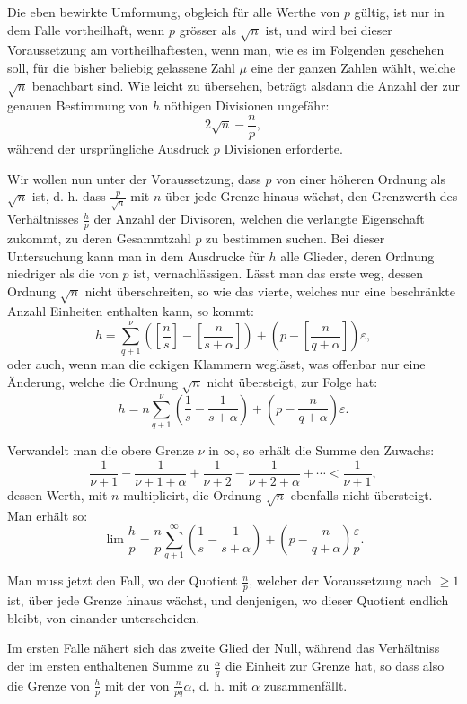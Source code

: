 \documentclass[11pt]{article}
\newcommand{\floor}[1]{\left[#1\right]}
\begin{document}
Die eben bewirkte Umformung, obgleich für alle Werthe von $p$ gültig, ist nur in dem Falle vortheilhaft, wenn $p$ grösser als $\sqrt n$ ist, und wird bei dieser Voraussetzung am vortheilhaftesten, wenn man, wie es im Folgenden geschehen soll, für die bisher beliebig gelassene Zahl $\mu$ eine der ganzen Zahlen wählt, welche $\sqrt n$ benachbart sind. Wie leicht zu übersehen, beträgt alsdann die Anzahl der zur genauen Bestimmung von $h$ nöthigen Divisionen ungefähr:
\[
 2\sqrt n-\frac np,
\]
während der ursprüngliche Ausdruck $p$ Divisionen erforderte.

Wir wollen nun unter der Voraussetzung, dass $p$ von einer höheren Ordnung als $\sqrt n$ ist, d. h. dass $\frac p{\sqrt n}$ mit $n$ über jede Grenze hinaus wächst, den Grenzwerth des Verhältnisses $\frac hp$ der Anzahl der Divisoren, welchen die verlangte Eigenschaft zukommt, zu deren Gesammtzahl $p$ zu bestimmen suchen. Bei dieser Untersuchung kann man in dem Ausdrucke für $h$ alle Glieder, deren Ordnung niedriger als die von $p$ ist, vernachlässigen. Lässt man das erste weg, dessen Ordnung $\sqrt n$ nicht überschreiten, so wie das vierte, welches nur eine beschränkte Anzahl Einheiten enthalten kann, so kommt:
\[
 h=\sum_{q+1}^{\nu}\left(\floor{\frac ns}-\floor{\frac n{s+\alpha}}\right)
 +\left(p-\floor{\frac n{q+\alpha}}\right)\varepsilon,
\]
oder auch, wenn man die eckigen Klammern weglässt, was offenbar nur eine Änderung, welche die Ordnung $\sqrt n$ nicht übersteigt, zur Folge hat:
\[
 h=n\sum_{q+1}^{\nu}\left(\frac1s-\frac1{s+\alpha}\right)+\left(p-\frac n{q+\alpha}\right)\varepsilon.
\]

Verwandelt man die obere Grenze $\nu$ in $\infty$, so erhält die Summe den Zuwachs:
\[
 \frac1{\nu+1}-\frac1{\nu+1+\alpha}
 +\frac1{\nu+2}-\frac1{\nu+2+\alpha}+\cdots<\frac1{\nu+1},
\]
dessen Werth, mit $n$ multiplicirt, die Ordnung $\sqrt n$ ebenfalls nicht übersteigt. Man erhält so:
\[
 \lim\frac hp=\frac np\sum_{q+1}^{\infty}\left(\frac1s-\frac1{s+\alpha}\right)
 +\left(p-\frac n{q+\alpha}\right)\frac{\varepsilon}{p}.
\]

Man muss jetzt den Fall, wo der Quotient $\frac np$, welcher der Voraussetzung nach $\geq1$ ist, über jede Grenze hinaus wächst, und denjenigen, wo dieser Quotient endlich bleibt, von einander unterscheiden.

Im ersten Falle nähert sich das zweite Glied der Null, während das Verhältniss der im ersten enthaltenen Summe zu $\frac{\alpha}{q}$ die Einheit zur Grenze hat, so dass also die Grenze von $\frac hp$ mit der von $\frac n{pq}\alpha$, d. h. mit $\alpha$ zusammenfällt.
\end{document}
